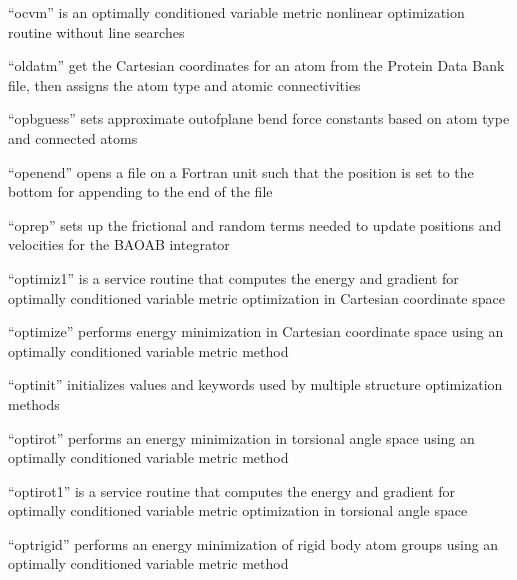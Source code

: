 \documentclass[letterpaper,11pt,english]{sphinxmanual}
\begin{document}

“ocvm” is an optimally conditioned variable metric nonlinear
optimization routine without line searches


“oldatm” get the Cartesian coordinates for an atom from
the Protein Data Bank file, then assigns the atom type
and atomic connectivities


“opbguess” sets approximate out\sphinxhyphen{}of\sphinxhyphen{}plane bend force constants
based on atom type and connected atoms


“openend” opens a file on a Fortran unit such that the position
is set to the bottom for appending to the end of the file


“oprep” sets up the frictional and random terms needed to
update positions and velocities for the BAOAB integrator



“optimiz1” is a service routine that computes the energy and
gradient for optimally conditioned variable metric optimization
in Cartesian coordinate space


“optimize” performs energy minimization in Cartesian coordinate
space using an optimally conditioned variable metric method


“optinit” initializes values and keywords used by multiple
structure optimization methods


“optirot” performs an energy minimization in torsional angle
space using an optimally conditioned variable metric method


“optirot1” is a service routine that computes the energy and
gradient for optimally conditioned variable metric optimization
in torsional angle space


“optrigid” performs an energy minimization of rigid body atom
groups using an optimally conditioned variable metric method
\end{document}
